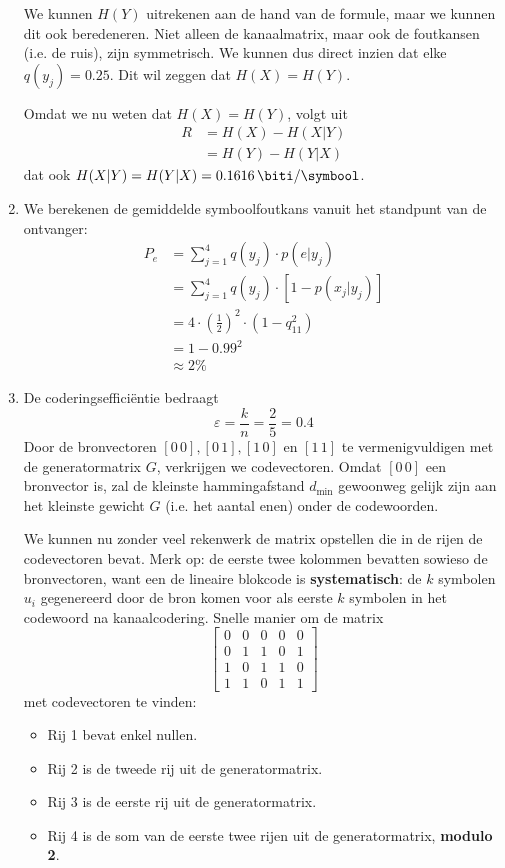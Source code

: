 \documentclass[kulak]{kulakarticle}
\begin{document}
\begin{enumerate}
		We kunnen \(H(Y)\) uitrekenen aan de hand van de formule, maar we kunnen dit ook beredeneren. Niet alleen de kanaalmatrix, maar ook de foutkansen (i.e. de ruis), zijn symmetrisch. We kunnen dus direct inzien dat elke \(q(y_j) = 0.25\). Dit wil zeggen dat \(H(X)=H(Y)\).

		Omdat we nu weten dat \(H(X)=H(Y)\), volgt uit \begin{align*}
			R&=H(X)-H(X|Y)\\&=H(Y)-H(Y|X)
		\end{align*} dat ook \(H(X|Y)=H(Y|X)=\SI{0.1616}{\biti \per \symbool}\).

		\item We berekenen de gemiddelde symboolfoutkans vanuit het standpunt van de ontvanger:
		\begin{align*}
			P_e &= \sum_{j=1}^{4}q(y_j)\cdot p(e|y_j)\\
				&= \sum_{j=1}^{4}q(y_j)\cdot [1-p(x_j|y_j)]\\
				&= 4 \cdot \left(\frac{1}{2}\right)^2 \cdot (1-q_{11}^2)\\
				&= 1-0.99^2\\
				&\approx \boxed{2\%}
		\end{align*}

		\item De coderingsefficiëntie bedraagt \[\varepsilon = \frac{k}{n}=\frac{2}{5}=\boxed{0.4}\] Door de bronvectoren \( [0 \, 0],[0 \, 1],[1 \, 0] \) en \([1 \, 1]\) te vermenigvuldigen met de generatormatrix \(G\), verkrijgen we codevectoren. Omdat \([0 \, 0]\) een bronvector is, zal de kleinste hammingafstand \(d_{\text{min}}\) gewoonweg gelijk zijn aan het kleinste gewicht \(G\) (i.e. het aantal enen) onder de codewoorden.

		We kunnen nu zonder veel rekenwerk de matrix opstellen die in de rijen de codevectoren bevat. Merk op: de eerste twee kolommen bevatten sowieso de bronvectoren, want een de lineaire blokcode is \textbf{systematisch}: de \(k\) symbolen \(u_i\) gegenereerd door de bron komen voor als eerste \(k\) symbolen in het codewoord na kanaalcodering.
		\newpage
		Snelle manier om de matrix \[\begin{bmatrix}
			0 & 0 & 0 & 0 & 0 \\
			0 & 1 & 1 & 0 & 1 \\
			1 & 0 & 1 & 1 & 0 \\
			1 & 1 & 0 & 1 & 1
		\end{bmatrix}\] met codevectoren te vinden:
		\begin{itemize}
			\item Rij 1 bevat enkel nullen.
			\item Rij 2 is de tweede rij uit de generatormatrix.
			\item Rij 3 is de eerste rij uit de generatormatrix.
			\item Rij 4 is de som van de eerste twee rijen uit de generatormatrix, \textbf{modulo 2}.
		\end{itemize}


\end{enumerate}
\end{document}
